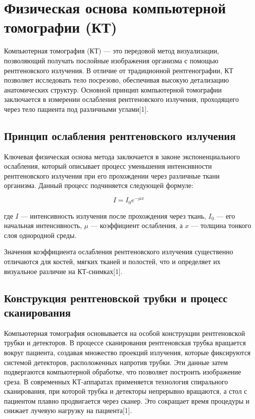 \section{Физическая основа компьютерной томографии (КТ)}
Компьютерная томография (КТ) — это передовой метод визуализации, позволяющий получать послойные изображения организма с помощью рентгеновского излучения. В отличие от традиционной рентгенографии, КТ позволяет исследовать тело посрезово, обеспечивая высокую детализацию анатомических структур. Основной принцип компьютерной томографии заключается в измерении ослабления рентгеновского излучения, проходящего через тело пациента под различными углами[1].

\subsection{Принцип ослабления рентгеновского излучения}
Ключевая физическая основа метода заключается в законе экспоненциального ослабления, который описывает процесс уменьшения интенсивности рентгеновского излучения при его прохождении через различные ткани организма. Данный процесс подчиняется следующей формуле:

\[ I = I_0 e^{-\mu x} \]

где \( I \) — интенсивность излучения после прохождения через ткань, \( I_0 \) — его начальная интенсивность, \( \mu \) — коэффициент ослабления, а \( x \) — толщина тонкого слоя однородной среды. 

Значения коэффициента ослабления рентгеновского излучения существенно отличаются для костей, мягких тканей и полостей, что и определяет их визуальное различие на КТ-снимках[1].

\subsection{Конструкция рентгеновской трубки и процесс сканирования}

Компьютерная томография основывается на особой конструкции рентгеновской трубки и детекторов. В процессе сканирования рентгеновская трубка вращается вокруг пациента, создавая множество проекций излучения, которые фиксируются системой детекторов, расположенных напротив трубки. Эти данные затем подвергаются компьютерной обработке, что позволяет построить изображение среза. В современных КТ-аппаратах применяется технология спирального сканирования, при которой трубка и детекторы непрерывно вращаются, а стол с пациентом плавно продвигается через сканер. Это сокращает время процедуры и снижает лучевую нагрузку на пациента[1].

